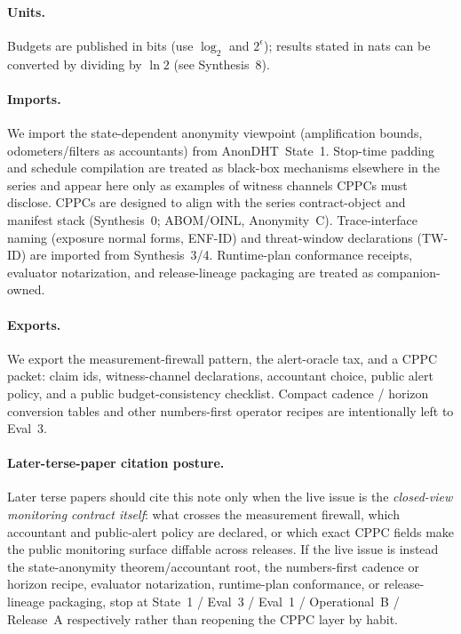 \documentclass[11pt]{article}
\begin{document}
\paragraph{Units.} Budgets are published in bits (use $\log_2$ and $2^{\epsilon}$); results stated in nats can be converted by dividing by $\ln 2$ (see Synthesis~8).\cite{series:notation}

\paragraph{Imports.}
We import the state-dependent anonymity viewpoint (amplification bounds, odometers/filters as accountants) from AnonDHT~State~1.\cite{series:state1}
Stop-time padding and schedule compilation are treated as black-box mechanisms elsewhere in the series and appear here only as examples of witness channels CPPCs must disclose.\cite{series:stoptimeaddendum,series:schedcompiler}
CPPCs are designed to align with the series contract-object and manifest stack (Synthesis~0; ABOM/OINL, Anonymity~C).\cite{series:contractobjects,series:abomoinl}
Trace-interface naming (exposure normal forms, ENF-ID) and threat-window declarations (TW-ID) are imported from Synthesis~3/4.\cite{series:traceifaces,series:threatwindows}
Runtime-plan conformance receipts, evaluator notarization, and release-lineage packaging are treated as companion-owned.\cite{series:opB,series:evalnotary,series:release}

\paragraph{Exports.}
We export the measurement-firewall pattern, the alert-oracle tax, and a CPPC packet: claim ids, witness-channel declarations, accountant choice, public alert policy, and a public budget-consistency checklist. Compact cadence / horizon conversion tables and other numbers-first operator recipes are intentionally left to Eval~3.\cite{series:eval3}

\paragraph{Later-terse-paper citation posture.}
Later terse papers should cite this note only when the live issue is the \emph{closed-view monitoring contract itself}: what crosses the measurement firewall, which accountant and public-alert policy are declared, or which exact CPPC fields make the public monitoring surface diffable across releases. If the live issue is instead the state-anonymity theorem/accountant root, the numbers-first cadence or horizon recipe, evaluator notarization, runtime-plan conformance, or release-lineage packaging, stop at State~1 / Eval~3 / Eval~1 / Operational~B / Release~A respectively rather than reopening the CPPC layer by habit.\cite{series:state1,series:eval3,series:evalnotary,series:opB,series:release}
\end{document}
